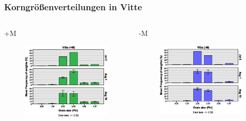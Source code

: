 \documentclass{beamer}
\begin{document}
\begin{frame}
\frametitle{Korngrößenverteilungen in Vitte}
\begin{columns}
\begin{column}{5.5cm}
+M
\begin{figure}
\includegraphics[width=\textwidth]{images/grainsize/sediment_im_jahr1.eps}
\end{figure}
\end{column}
\begin{column}{5.5cm}
-M
\begin{figure}
\includegraphics[width=\textwidth]{images/grainsize/sediment_im_jahr2.eps}
\end{figure}
\end{column}
\end{columns}
\end{frame}
\end{document}
